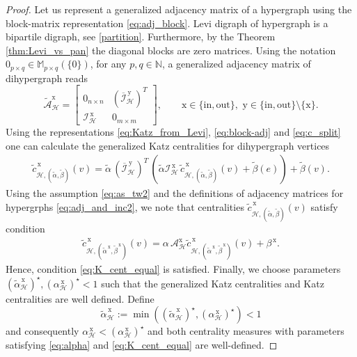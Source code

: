 \documentclass[a4paper,12pt]{article}
\theoremstyle{definition}
\theoremstyle{remark}
\newcommand{\mH}{\mathcal{H}}
\newcommand{\tin}{\mathrm{in}}
\newcommand{\out}{\mathrm{out}}
\begin{document}
\begin{proof}
Let us represent a generalized adjacency matrix of a hypergraph using the block-matrix representation \eqref{eq:adj_block}. Levi digraph of hypergraph is a bipartile digraph, see \eqref{partition}. Furthermore, by the Theorem \ref{thm:Levi_vs_pan} the diagonal blocks are zero matrices. Using the notation $0_{p\times q}\in \mathbb{M}_{p\times q}(\{0\})$, for any $p,q\in \mathbb{N}$, a generalized adjacency matrix of dihypergraph reads
\begin{equation}\label{eq:block-adj}
\tilde{\mathcal{A}}_{\mH}^{\mathrm{x}}=\left[\begin{array}{cc}
0_{n\times n}&(\overline{\mathcal{I}}_{\mH}^{\,\textrm{y}})^T\\
\mathcal{I}_{\mH}^{\,\textrm{x}}&0_{m\times m}
\end{array}\right],\qquad \textrm{x}\in\{\tin,\out\},\,\, \textrm{y}\in\{\tin,\out\}\setminus\{\textrm{x}\}.
\end{equation}
Using the representations \eqref{eq:Katz_from_Levi}, \eqref{eq:block-adj} and \eqref{eq:c_split} one can calculate the generalized Katz centralities for dihypergraph vertices
\begin{eqnarray}
\tilde{c}^{\,\textrm{x}}_{\mH, (\tilde{\alpha},\tilde{\beta})}(v)=\tilde{\alpha}\, (\overline{\mathcal{I}}_{\mH}^{\,\textrm{y}})^T \,\left(\tilde{\alpha}\mathcal{I}_{\mH}^{\,\textrm{x}} \, \tilde{c}^{\,\textrm{x}}_{\mH, (\tilde{\alpha},\tilde{\beta})}(v)+\tilde{\beta}(e)\right)+\tilde{\beta}(v).
\end{eqnarray}
Using the assumption \eqref{eq:as_tw2} and the definitions of adjacency matrices for hypergrphs \eqref{eq:adj_and_inc2}, we note that centralities $\tilde{c}^{\,\textrm{x}}_{\mH, (\tilde{\alpha},\tilde{\beta})}(v)$ satisfy condition
\begin{eqnarray}
\tilde{c}^{\,\textrm{x}}_{\mH, (\tilde{\alpha}^{\,\textrm{x}},\tilde{\beta}^{\,\textrm{x}})}(v)=\alpha\,  \mathcal{A}^{\textrm{x}}_{\mH}\tilde{c}^{\,\textrm{x}}_{\mH, (\tilde{\alpha}^{\,\textrm{x}},\tilde{\beta}^{\,\textrm{x}})}(v)+\beta^{\,\textrm{x}}.
\end{eqnarray}
Hence, condition \eqref{eq:K_cent_equal} is satisfied. Finally, we choose parameters $(\tilde{\alpha}^{\,\textrm{x}}_{\mH})^{\star}, (\alpha^{\,\textrm{x}}_{\mH})^{\star}<1$ such that the generalized Katz centralities and Katz centralities are well defined. Define \begin{equation}\label{eq:alpha}
\tilde{\alpha}^{\,\textrm{x}}_{\mH}:=\min((\tilde{\alpha}^{\,\textrm{x}}_{\mH})^{\star}, (\alpha^{\,\textrm{x}}_{\mH})^{\star})<1
\end{equation}
and consequently $\alpha^{\,\textrm{x}}_{\mH}<(\alpha^{\,\textrm{x}}_{\mH})^{\star}$ and both centrality measures with parameters satisfying \eqref{eq:alpha} and \eqref{eq:K_cent_equal} are well-defined.
\end{proof}
\end{document}
